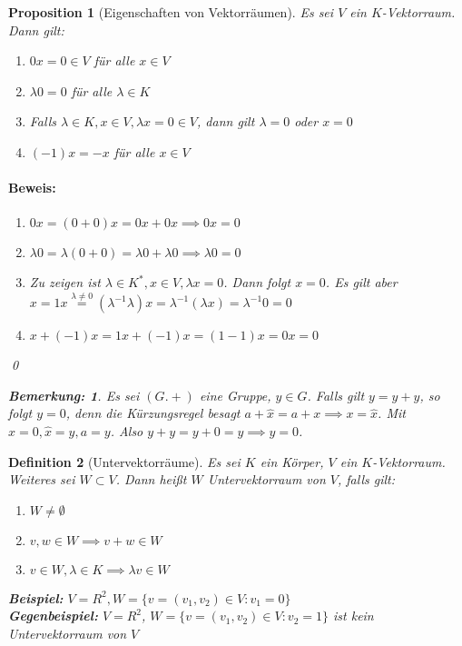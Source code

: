 \documentclass{report}
\newcommand{\IN}[1]{\index{#1|BH}}
\newcommand{\lb}{\lambda}
\theoremstyle{customrem}
\newtheorem*{bemerkung}{Bemerkung\textnormal:}
\theoremstyle{customdef}
\newtheorem{definition}{Definition}[chapter]
\newtheorem{proposition}[definition]{Proposition}
\renewenvironment{proof}{\paragraph{Beweis: }}{\qed}
\begin{document}
	\begin{proposition}[Eigenschaften von Vektorräumen]
		Es sei $V$ ein $K$-Vektorraum. Dann gilt:
		\begin{enumerate}[leftmargin=4cm]
			\itemsep0cm
			\item $0 x = 0 \in V$ für alle $x \in V$
			\item $\lb 0 = 0$ für alle $\lb \in K$
			\item Falls $\lb \in K, x \in V, \lb x = 0 \in V$, dann gilt $\lb = 0$ oder $x = 0$
			\item $(-1) x = -x$ für alle $x \in V$
		\end{enumerate}
		\begin{proof}
			\begin{enumerate}
				\itemsep0cm
				\item $0 x = (0 + 0)x = 0x + 0x \implies 0x = 0$
				\item $\lb 0 = \lb(0 + 0) = \lb 0 + \lb 0 \implies \lb 0 = 0$
				\item Zu zeigen ist $\lb \in K^\ast, x \in V, \lb x = 0$. Dann folgt $x = 0$. Es gilt aber $x = 1 x \overset{\lb \neq 0}{=} (\lb ^{-1} \lb) x = \lb^{-1}(\lb x) = \lb^{-1} 0 = 0$
				\item $x + (-1) x = 1x + (-1) x = (1 - 1)  x = 0 x = 0$
			\end{enumerate}
		\end{proof}
		\begin{bemerkung}
			Es sei $(G. +)$ eine Gruppe, $y \in G$. Falls gilt $y = y + y$, so folgt $y = 0$, denn die Kürzungsregel besagt $a + \hat{x} = a+x \implies x = \hat{x}$. Mit $x = 0, \hat{x} = y, a = y$. Also $y +y = y + 0 = y \implies y = 0$.
		\end{bemerkung}
	\end{proposition}
	
	\begin{definition}[Untervektorräume]
		\IN{Untervektorraum}
		Es sei $K$ ein Körper, $V$ ein $K$-Vektorraum. Weiteres sei $W \subset V$. Dann heißt $W$ Untervektorraum von $V$, falls gilt:
		
		\begin{enumerate}[leftmargin=4cm]
			\itemsep0cm
			\item $W \neq \emptyset$ 
			\item $v, w \in W \implies v + w \in W$
			\item $v \in W, \lb \in K \implies \lb v \in W$
		\end{enumerate}
		
		\textbf{Beispiel:}
		$V = R^2, W = \{v = (v_1, v_2) \in V : v_1 = 0\}$\\
		\textbf{Gegenbeispiel:}
		$V = R^2$, $W = \{v = (v_1, v_2) \in V : v_2 = 1\}$ ist kein Untervektorraum von $V$
	\end{definition}
	
\end{document}
